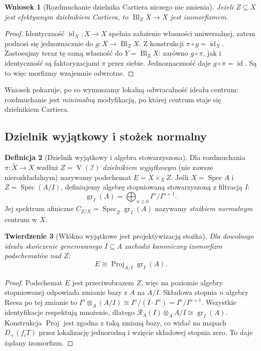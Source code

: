 \documentclass[11pt,a4paper,openany]{report}
\numberwithin{equation}{section}
\theoremstyle{plain}
\newtheorem{twierdzenie}{Twierdzenie}[section]
\newtheorem{wniosek}[twierdzenie]{Wniosek}
\theoremstyle{definition}
\newtheorem{definicja}[twierdzenie]{Definicja}
\theoremstyle{remark}
\newcommand{\V}{\operatorname V}
\newcommand{\id}{\operatorname{id}}
\newcommand{\Spec}{\operatorname{Spec}}
\begin{document}
\begin{wniosek}[Rozdmuchanie dzielnika Cartiera niczego nie zmienia]
\label{wn:ga5-cartier-trivial}
Jeżeli $Z\subseteq X$ jest efektywnym dzielnikiem
Cartiera, to $\operatorname{Bl}_Z X\to X$ jest izomorfizmem.
\end{wniosek}
\begin{proof}
Identyczność $\id_X:X\to X$ spełnia założenie własności
uniwersalnej, zatem podnosi się jednoznacznie do
$g:X\to\operatorname{Bl}_Z X$. Z konstrukcji
$\pi\circ g=\id_X$. Zastosujmy teraz tę samą własność
do $Y=\operatorname{Bl}_Z X$: zarówno $g\circ\pi$,
jak i identyczność są faktoryzacjami $\pi$ przez siebie.
Jednoznaczność daje $g\circ\pi=\id$. Są to więc
morfizmy wzajemnie odwrotne.
\end{proof}

Wniosek pokazuje, po co wymuszamy lokalną odwracalność
ideału centrum: rozdmuchanie jest \emph{minimalną}
modyfikacją, po której centrum staje się dzielnikiem Cartiera.

\subsection{Dzielnik wyjątkowy i stożek normalny}

\begin{definicja}[Dzielnik wyjątkowy i algebra stowarzyszona]
Dla rozdmuchania $\pi:\widetilde X\to X$ wzdłuż
$Z=\V(\mathcal I)$ \emph{dzielnikiem wyjątkowym}
(nie zawsze nierozkładalnym) nazywamy podschemat
$E=\widetilde X\times_X Z$.
Jeśli $X=\Spec A$ i $Z=\Spec(A/I)$, definiujemy
algebrę stopniowaną stowarzyszoną z filtracją $I$:
\[
 \operatorname{gr}_I(A)=\bigoplus_{n\ge0}I^n/I^{n+1}.
\]
Jej spektrum afiniczne
$C_{Z/X}=\Spec_Z\operatorname{gr}_I(A)$
nazywamy \emph{stożkiem normalnym} centrum w $X$.
\end{definicja}

\begin{twierdzenie}[Włókno wyjątkowe jest projektywizacją stożka]
\label{tw:ga5-normalcone}
Dla dowolnego ideału skończenie generowanego $I\subseteq A$
zachodzi kanoniczny izomorfizm podschematów nad $Z$:
\[
 E\cong\operatorname{Proj}_{A/I}\operatorname{gr}_I(A).
\]
\end{twierdzenie}
\begin{proof}
Podschemat $E$ jest przeciwobrazem $Z$, więc na poziomie
algebry stopniowanej odpowiada zmianie bazy z $A$ na
$A/I$. Składowa stopnia $n$ algebry Reesa po tej
zmianie to
$I^n\otimes_A(A/I)\cong I^n/(I\cdot I^n)=I^n/I^{n+1}$.
Wszystkie identyfikacje respektują mnożenie, dlatego
$\mathcal R_A(I)\otimes_A A/I\cong\operatorname{gr}_I(A)$.
Konstrukcja $\operatorname{Proj}$ jest zgodna z taką
zmianą bazy, co widać na mapach
$D_+(f_iT)$ przez lokalizację jednorodną i wzięcie
składowej stopnia zero. To daje żądany izomorfizm.
\end{proof}
\end{document}
